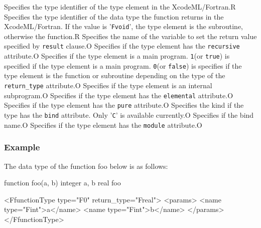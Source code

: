 \begin{XcodeMLAttributes}
{Specifies the type identifier of the type element in the XcodeML/Fortran.}{R}
{Specifies the type identifier of the data type the function returns in the XcodeML/Fortran.
If the value is '{\tt Fvoid}', the type element is the subroutine, otherwise the function.}{R}
{Specifies the name of the variable to set the return value specified by {\tt result} clause.}{O}
{Specifies if the type element has the {\tt recursive} attribute.}{O}
{Specifies if the type element is a main program.
{\tt 1}(or {\tt true}) is specified if the type element is a main program.
{\tt 0}(or {\tt false}) is specifies if the type element is the function or subroutine depending on the type of the {\tt return\_type} attribute.}{O}
{Specifies if the type element is an internal subprogram.}{O}
{Specifies if the type element has the {\tt elemental} attribute.}{O}
{Specifies if the type element has the {\tt pure} attribute.}{O}
{Specifies the kind if the type has the {\tt bind} attribute. Only '{\tt C}' is available currently.}{O}
{Specifies if the bind name.}{O}
{Specifies if the type element has the {\tt module} attribute.}{O}
\end{XcodeMLAttributes}


\subsubsection*{Example}

The data type of the function foo below is as follows:
\vspace{2mm}

\begin{Fexample90}
function foo(a, b)
  integer a, b
  real foo
\end{Fexample90}
\vspace{1mm}

\begin{XcodeMLFExample}
<FfunctionType type="F0" return_type="Freal">
  <params>
    <name type="Fint">a</name>
    <name type="Fint">b</name>
  </params>
</FfunctionType>
\end{XcodeMLFExample}


